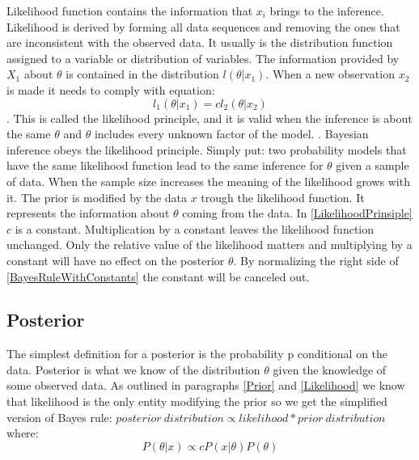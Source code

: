 Likelihood function contains the information that $x_i$ brings to the inference. \cite{Robert2007TheBC} Likelihood is derived by forming all data sequences and removing the ones that are inconsistent with the observed data. It usually is the distribution function assigned to a variable or distribution of variables. \cite{Mcelreath2015StatisticalRA} The information provided by $X_1$ about $\theta$ is contained in the distribution $l(\theta|x_1)$. When a new observation $x_2$ is made it needs to comply with equation:
\begin{equation}\label{LikelihoodPrinsiple}
l_1(\theta|x_1) = cl_2(\theta|x_2)
\end{equation}
\cite{Robert2007TheBC}. This is called the likelihood principle, and it is valid when the inference is about the same $\theta$ and $\theta$ includes every unknown factor of the model. \cite{Robert2007TheBC}. Bayesian inference obeys the likelihood principle. Simply put: two probability models that have the same likelihood function lead to the same inference for $\theta$ given a sample of data.\cite{Gel2014BayesianDA}
When the sample size increases the meaning of the likelihood grows with it. \cite{Mcelreath2015StatisticalRA} The prior is modified by the data $x$ trough the likelihood function. It represents the information about $\theta$ coming from the data. In \ref{LikelihoodPrinsiple} $c$ is a constant. Multiplication by a constant leaves the likelihood function unchanged. Only the relative value of the likelihood matters and multiplying by a constant will have no effect on the posterior $\theta$. By normalizing the right side of \ref{BayesRuleWithConstants} the constant will be canceled out.\cite{Box1973BayesianII}
 
\subsection{Posterior}\label{Posterior}
The simplest definition for a posterior is the probability p conditional on the data.\cite{Mcelreath2015StatisticalRA} Posterior is what we know of the distribution $\theta$ given the knowledge of some observed data.
As outlined in paragraphs \ref{Prior} and \ref{Likelihood} we know that likelihood is the only entity modifying the prior so we get the simplified version of Bayes rule: $posterior\ distribution \propto likelihood * prior\ distribution$ where: 
\begin{equation}\label{BayesRuleWithConstants}
P(\theta|x) \propto cP(x|\theta)P(\theta)
\end{equation}\cite{Box1973BayesianII}

